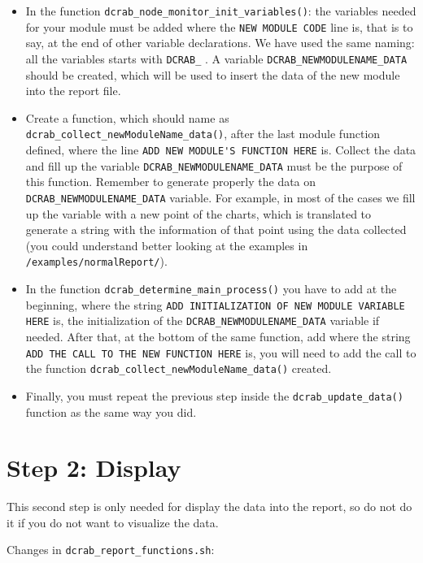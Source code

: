 \documentclass[10pt,a4paper]{report}
\begin{document}
\begin{itemize}
  \item In the function \texttt{dcrab\_node\_monitor\_init\_variables()}: the variables needed for your module must be added where the \verb+NEW MODULE CODE+ line is, that is to say, at the end of other variable declarations. We have used the same naming: all the variables starts with \verb+DCRAB_+ . A variable \verb+DCRAB_NEWMODULENAME_DATA+ should be created, which will be used to insert the data of the new module into the report file.
  \item Create a function, which should name as \texttt{dcrab\_collect\_newModuleName\_data()}, after the last module function defined, where the line \verb+ADD NEW MODULE'S FUNCTION HERE+ is. Collect the data and fill up the variable \verb+DCRAB_NEWMODULENAME_DATA+ must be the purpose of this function. Remember to generate properly the data on \verb+DCRAB_NEWMODULENAME_DATA+ variable. For example, in most of the cases we fill up the variable with a new point of the charts, which is translated to generate a string with the information of that point using the data collected (you could understand better looking at the examples in \verb+/examples/normalReport/+).
  \item In the function \texttt{dcrab\_determine\_main\_process()} you have to add at the beginning, where the string \verb+ADD INITIALIZATION OF NEW MODULE VARIABLE HERE+ is, the initialization of the \verb+DCRAB_NEWMODULENAME_DATA+ variable if needed. After that, at the bottom of the same function, add where the string \verb+ADD THE CALL TO THE NEW FUNCTION HERE+ is, you will need to add the call to the function \texttt{dcrab\_collect\_newModuleName\_data()} created.
  \item Finally, you must repeat the previous step inside the \texttt{dcrab\_update\_data()} function as the same way you did.
\end{itemize}

\section{Step 2: Display}

This second step is only needed for display the data into the report, so do not do it if you do not want to visualize the data.

Changes in \texttt{dcrab\_report\_functions.sh}:
\end{document}
